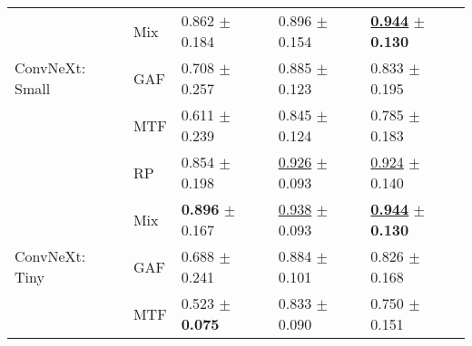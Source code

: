 \begin{tabular}[t]{lllll}
 & Mix & \textcolor[rgb]{0.0787824530,0.5000000000,0}{0.862} $\pm$ \textcolor[rgb]{0.5941088240,0.4058911760,0}{0.184} & \textcolor[rgb]{0.3348930481,0.5000000000,0}{0.896} $\pm$ \textcolor[rgb]{0.9311751943,0.0688248057,0}{0.154} & \underline{\textbf{\textcolor[rgb]{0.0000000000,0.5000000000,0}{0.944}}} $\pm$ \textbf{\textcolor[rgb]{0.0000000000,0.5000000000,0}{0.130}} \\
ConvNeXt: Small & GAF & \textcolor[rgb]{0.4431512981,0.5000000000,0}{0.708} $\pm$ \textcolor[rgb]{1.0000000000,0.0000000000,0}{0.257} & \textcolor[rgb]{0.4059714795,0.5000000000,0}{0.885} $\pm$ \textcolor[rgb]{0.5007263060,0.4992736940,0}{0.123} & \textcolor[rgb]{0.4000000000,0.5000000000,0}{0.833} $\pm$ \textcolor[rgb]{0.4683369943,0.5000000000,0}{0.195} \\
 & MTF & \textcolor[rgb]{0.6729334527,0.3270665473,0}{0.611} $\pm$ \textcolor[rgb]{0.8999515496,0.1000484504,0}{0.239} & \textcolor[rgb]{0.6510695187,0.3489304813,0}{0.845} $\pm$ \textcolor[rgb]{0.5159088943,0.4840911057,0}{0.124} & \textcolor[rgb]{0.5750000000,0.4250000000,0}{0.785} $\pm$ \textcolor[rgb]{0.3827984820,0.5000000000,0}{0.183} \\
 & RP & \textcolor[rgb]{0.0984780662,0.5000000000,0}{0.854} $\pm$ \textcolor[rgb]{0.6747481909,0.3252518091,0}{0.198} & \underline{\textcolor[rgb]{0.1510695187,0.5000000000,0}{0.926}} $\pm$ \textcolor[rgb]{0.0999682822,0.5000000000,0}{0.093} & \underline{\textcolor[rgb]{0.0750000000,0.5000000000,0}{0.924}} $\pm$ \textcolor[rgb]{0.0718829596,0.5000000000,0}{0.140} \\
 & Mix & \textbf{\textcolor[rgb]{0.0000000000,0.5000000000,0}{0.896}} $\pm$ \textcolor[rgb]{0.5039453787,0.4960546213,0}{0.167} & \underline{\textcolor[rgb]{0.0775401070,0.5000000000,0}{0.938}} $\pm$ \textcolor[rgb]{0.0931749808,0.5000000000,0}{0.093} & \underline{\textbf{\textcolor[rgb]{0.0000000000,0.5000000000,0}{0.944}}} $\pm$ \textbf{\textcolor[rgb]{0.0000000000,0.5000000000,0}{0.130}} \\
ConvNeXt: Tiny & GAF & \textcolor[rgb]{0.4923903312,0.5000000000,0}{0.688} $\pm$ \textcolor[rgb]{0.9113745311,0.0886254689,0}{0.241} & \textcolor[rgb]{0.4108734403,0.5000000000,0}{0.884} $\pm$ \textcolor[rgb]{0.2082138349,0.5000000000,0}{0.101} & \textcolor[rgb]{0.4250000000,0.5000000000,0}{0.826} $\pm$ \textcolor[rgb]{0.2789740494,0.5000000000,0}{0.168} \\
 & MTF & \textcolor[rgb]{0.8818263205,0.1181736795,0}{0.523} $\pm$ \textbf{\textcolor[rgb]{0.0000000000,0.5000000000,0}{0.075}} & \textcolor[rgb]{0.7295008913,0.2704991087,0}{0.833} $\pm$ \textcolor[rgb]{0.0562553209,0.5000000000,0}{0.090} & \textcolor[rgb]{0.7000000000,0.3000000000,0}{0.750} $\pm$ \textcolor[rgb]{0.1516428390,0.5000000000,0}{0.151} \\

\end{tabular}
